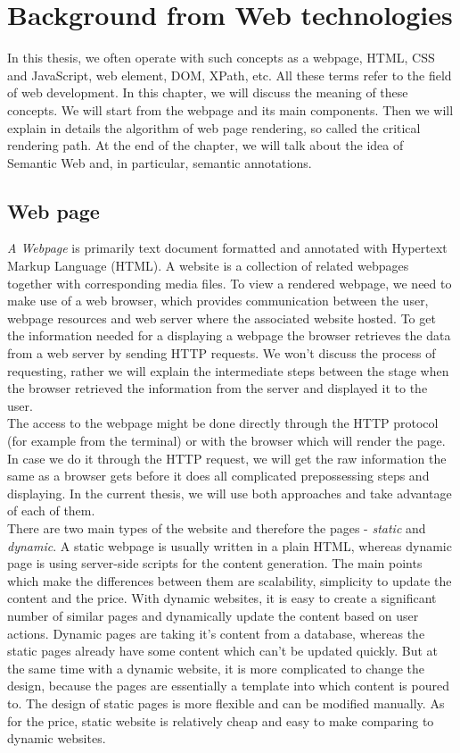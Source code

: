 \chapter{Background from Web technologies}
\label{chap:background}

In this thesis, we often operate with such concepts as a webpage, HTML, CSS and JavaScript, web element, DOM, XPath, etc. All these terms refer to the field of web development. In this chapter, we will discuss the meaning of these concepts. We will start from the webpage and its main components. Then we will explain in details the algorithm of web page rendering, so called the critical rendering path. At the end of the chapter, we will talk about the idea of Semantic Web and, in particular, semantic annotations.

\section{Web page}
\textit{A Webpage} is primarily text document formatted and annotated with Hypertext Markup Language (HTML). A website is a collection of related webpages together with corresponding media files. To view a rendered webpage, we need to make use of a web browser, which provides communication between the user, webpage resources and web server where the associated website hosted. To get the information needed for a displaying a webpage the browser retrieves the data from a web server by sending HTTP requests. We won't discuss the process of requesting, rather we will explain the intermediate steps between the stage when the browser retrieved the information from the server and displayed it to the user.\\ 

The access to the webpage might be done directly through the HTTP protocol (for example from the terminal) or with the browser which will render the page. In case we do it through the HTTP request, we will get the raw information the same as a browser gets before it does all complicated prepossessing steps and displaying. In the current thesis, we will use both approaches and take advantage of each of them.\\

There are two main types of the website and therefore the pages - \textit{static} and \textit{dynamic}. A static webpage is usually written in a plain HTML, whereas dynamic page is using server-side scripts for the content generation. The main points which make the differences between them are scalability, simplicity to update the content and the price. With dynamic websites, it is easy to create a significant number of similar pages and dynamically update the content based on user actions. Dynamic pages are taking it's content from a database, whereas the static pages already have some content which can't be updated quickly. But at the same time with a dynamic website, it is more complicated to change the design, because the pages are essentially a template into which content is poured to. The design of static pages is more flexible and can be modified manually. As for the price, static website is relatively cheap and easy to make comparing to dynamic websites.\\ 

